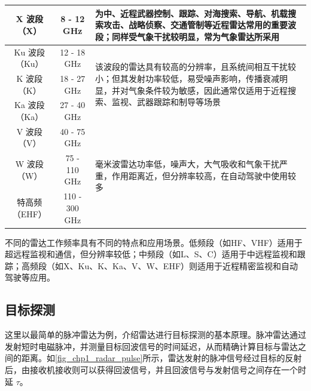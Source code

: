 \begin{table}[htb!]
\begin{tabular}{c|c|p{7cm}}
        \hline
        X 波段（X）   & 8 - 12 GHz     & 为中、近程武器控制、跟踪、对海搜索、导航、机载搜索攻击、战略侦察、交通管制等近程雷达常用的重要波段；同样受气象干扰较明显，常为气象雷达所采用                                        \\
        \hline
        Ku 波段（Ku） & 12 - 18 GHz    & \multirow{3}{7cm}{该波段的雷达具有较高的分辨率，且系统间相互干扰较小；但其发射功率较低，易受噪声影响，传播衰减明显，并对气象条件较为敏感，因此通常仅适用于近程搜索、监视、武器跟踪和制导等场景}     \\
        \cline{1-2}
        K 波段（K）   & 18 - 27 GHz    &                                                                                                               \\
        \cline{1-2}
        Ka 波段（Ka） & 27 - 40 GHz    &                                                                                                               \\
        \hline
        V 波段（V）   & 40 - 75 GHz    & \multirow{3}{7cm}{毫米波雷达功率低，噪声大，大气吸收和气象干扰严重，作用距离近，但分辨率较高，在自动驾驶中使用较多}                                           \\
        \cline{1-2}
        W 波段（W）   & 75 - 110 GHz   &                                                                                                               \\
        \cline{1-2}
        特高频（EHF）  & 110 - 300 GHz  &                                                                                                               \\
        \hline
    \end{tabular}
\end{table}
不同的雷达工作频率具有不同的特点和应用场景。低频段（如HF、VHF）适用于超远程监视和通信，但分辨率较低；中频段（如L、S、C）适用于中远程监视和跟踪；高频段（如X、Ku、K、Ka、V、W、EHF）则适用于近程精密监视和自动驾驶等应用。



\subsection{目标探测}
这里以最简单的脉冲雷达为例，介绍雷达进行目标探测的基本原理。脉冲雷达通过发射短时电磁脉冲，并测量目标回波信号的时间延迟，从而精确计算目标与雷达之间的距离。如\cref{fig_chp1_radar_pulse}所示，雷达发射的脉冲信号经过目标的反射后，由接收机接收则可以获得回波信号，并且回波信号与发射信号之间存在一个时延 $\tau$。

